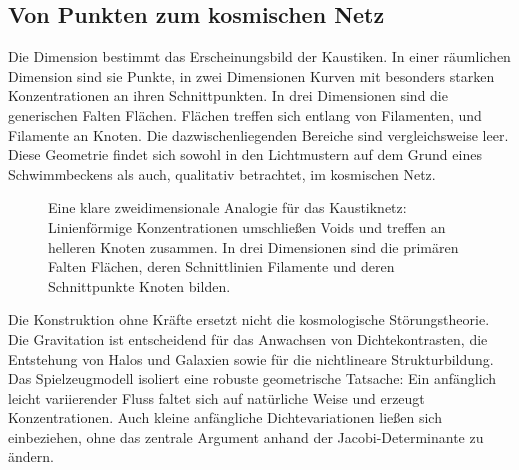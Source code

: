 \subsection{Von Punkten zum kosmischen Netz}

Die Dimension bestimmt das Erscheinungsbild der Kaustiken. In einer räumlichen Dimension sind sie Punkte, in zwei Dimensionen Kurven mit besonders starken Konzentrationen an ihren Schnittpunkten. In drei Dimensionen sind die generischen Falten Flächen. Flächen treffen sich entlang von Filamenten, und Filamente an Knoten. Die dazwischenliegenden Bereiche sind vergleichsweise leer. Diese Geometrie findet sich sowohl in den Lichtmustern auf dem Grund eines Schwimmbeckens als auch, qualitativ betrachtet, im kosmischen Netz.

\begin{figure}[htbp]
\centering
{}
\caption{Eine klare zweidimensionale Analogie für das Kaustiknetz: Linienförmige Konzentrationen umschließen Voids und treffen an helleren Knoten zusammen. In drei Dimensionen sind die primären Falten Flächen, deren Schnittlinien Filamente und deren Schnittpunkte Knoten bilden.}
\label{fig:c09-caustic-network}
\end{figure}

Die Konstruktion ohne Kräfte ersetzt nicht die kosmologische Störungstheorie. Die Gravitation ist entscheidend für das Anwachsen von Dichtekontrasten, die Entstehung von Halos und Galaxien sowie für die nichtlineare Strukturbildung. Das Spielzeugmodell isoliert eine robuste geometrische Tatsache: Ein anfänglich leicht variierender Fluss faltet sich auf natürliche Weise und erzeugt Konzentrationen. Auch kleine anfängliche Dichtevariationen ließen sich einbeziehen, ohne das zentrale Argument anhand der Jacobi-Determinante zu ändern.

